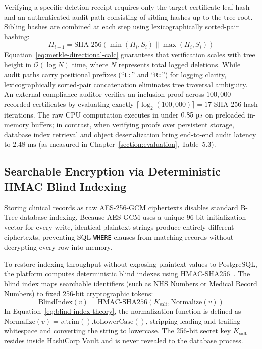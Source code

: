 Verifying a specific deletion receipt requires only the target certificate leaf hash and an authenticated audit path consisting of sibling hashes up to the tree root. Sibling hashes are combined at each step using lexicographically sorted-pair hashing:
\begin{equation}
    H_{i+1} = \text{SHA-256}(\min(H_i, S_i) \parallel \max(H_i, S_i))
    \label{eq:merkle-directional-calc}
\end{equation}
Equation~\ref{eq:merkle-directional-calc} guarantees that verification scales with tree height in $\mathcal{O}(\log N)$ time, where $N$ represents total logged deletions. While audit paths carry positional prefixes (``\texttt{L:}'' and ``\texttt{R:}'') for logging clarity, lexicographically sorted-pair concatenation eliminates tree traversal ambiguity. An external compliance auditor verifies an inclusion proof across $100{,}000$ recorded certificates by evaluating exactly $\lceil \log_2(100{,}000) \rceil = 17$ SHA-256 hash iterations. The raw CPU computation executes in under $0.85\text{~\textmu s}$ on preloaded in-memory buffers; in contrast, when verifying proofs over persistent storage, database index retrieval and object deserialization bring end-to-end audit latency to $2.48\text{~ms}$ (as measured in Chapter~\ref{section:evaluation}, Table~5.3).

\subsection{Searchable Encryption via Deterministic HMAC Blind Indexing}

Storing clinical records as raw AES-256-GCM ciphertexts disables standard B-Tree database indexing. Because AES-GCM uses a unique 96-bit initialization vector for every write, identical plaintext strings produce entirely different ciphertexts, preventing SQL \texttt{WHERE} clauses from matching records without decrypting every row into memory.

To restore indexing throughput without exposing plaintext values to PostgreSQL, the platform computes deterministic blind indexes using HMAC-SHA256~\cite{krawczyk_hmac_1997}. The blind index maps searchable identifiers (such as NHS Numbers or Medical Record Numbers) to fixed 256-bit cryptographic tokens:
\begin{equation}
    \text{BlindIndex}(v) = \text{HMAC-SHA256}(K_{\text{salt}}, \text{Normalize}(v))
    \label{eq:blind-index-theory}
\end{equation}
In Equation~\ref{eq:blind-index-theory}, the normalization function is defined as $\text{Normalize}(v) = v.\text{trim}().\text{toLowerCase}()$, stripping leading and trailing whitespace and converting the string to lowercase. The 256-bit secret key $K_{\text{salt}}$ resides inside HashiCorp Vault and is never revealed to the database process.

